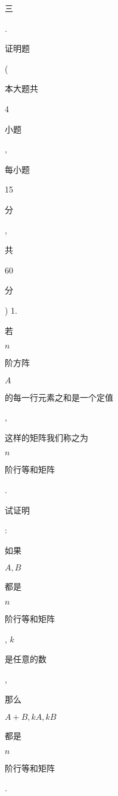 \documentclass[10pt]{article}
\begin{document}
\begin{CJK}{UTF8}{mj}三\end{CJK}. \begin{CJK}{UTF8}{mj}证明题\end{CJK} (\begin{CJK}{UTF8}{mj}本大题共\end{CJK} 4 \begin{CJK}{UTF8}{mj}小题\end{CJK}, \begin{CJK}{UTF8}{mj}每小题\end{CJK} 15 \begin{CJK}{UTF8}{mj}分\end{CJK}, \begin{CJK}{UTF8}{mj}共\end{CJK} 60 \begin{CJK}{UTF8}{mj}分\end{CJK}) 1. \begin{CJK}{UTF8}{mj}若\end{CJK} $n$ \begin{CJK}{UTF8}{mj}阶方阵\end{CJK} $A$ \begin{CJK}{UTF8}{mj}的每一行元素之和是一个定值\end{CJK}, \begin{CJK}{UTF8}{mj}这样的矩阵我们称之为\end{CJK} $n$ \begin{CJK}{UTF8}{mj}阶行等和矩阵\end{CJK}. \begin{CJK}{UTF8}{mj}试证明\end{CJK}: \begin{CJK}{UTF8}{mj}如果\end{CJK} $A, B$ \begin{CJK}{UTF8}{mj}都是\end{CJK} $n$ \begin{CJK}{UTF8}{mj}阶行等和矩阵\end{CJK}, $k$ \begin{CJK}{UTF8}{mj}是任意的数\end{CJK}, \begin{CJK}{UTF8}{mj}那么\end{CJK} $A+B, k A, k B$ \begin{CJK}{UTF8}{mj}都是\end{CJK} $n$ \begin{CJK}{UTF8}{mj}阶行等和矩阵\end{CJK}.
\end{document}
